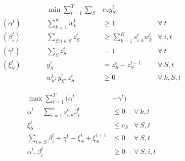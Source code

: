 \begin{minipage}[t]{0.5\textwidth}
	\vspace{-0.6cm}
        \begin{align*}
            && \min \sum_{t = 1}^{T} \sum_{S} & c_S y_S^t \\
            (\alpha^{t}) \qquad && \sum_{k=1}^{K} w_{k}^{t} & \geq 1  & \forall\ t \\
            (\beta_{i}^{t}) \qquad && \sum_{S: i \in S} z_{S}^{t} &\ge \sum_{k=1}^{K} s_{i,k}^{t} w_{k}^{t}   &\forall\ i,t\\
            (\gamma^{t}) \qquad && \sum_{S} z_{S}^{t} &= 1   &\forall\ t\\
            (\xi_{S}^{t}) \qquad && y_{S}^{t} &= z_{S}^{t} - z_{S}^{t-1}   &\forall\ S,t\\
            && w_{k}^{t}, y_{S}^{t}, z_{S}^{t} & \ge 0 & \forall\ k,S,t
         \end{align*}
\end{minipage}
%
\begin{minipage}[t]{0.5\textwidth}
	\vspace{-0.6cm}
        \begin{align*}
            \max \sum_{t=1}^{T}  (\alpha^{t} &+ \gamma^{t}) \\
            \alpha^{t} - \sum_{i=1}^{n} s_{i,k}^{t} \beta_{i}^{t} &\leq 0  &\forall\ k,t\\
             \xi_{S}^{t}   &\leq c_{S}  &\forall\ S,t \\
            \sum_{i \in S}\beta_{i}^{t} + \gamma^{t} - \xi_{S}^{t} + \xi_{S}^{t+1}  &\leq 0  &\forall\ S,t \\
            \alpha^{t}, \beta_{i}^{t} & \ge 0 & \forall\ S,i,t
        \end{align*}
\end{minipage}

